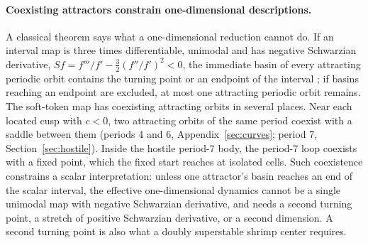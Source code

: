 \documentclass[11pt,letterpaper]{article}
\begin{document}
\paragraph{Coexisting attractors constrain one-dimensional descriptions.} A classical theorem says what a
one-dimensional reduction cannot do. If an interval map is three times differentiable, unimodal and has negative
Schwarzian derivative, $Sf=f'''/f'-\tfrac32(f''/f')^2<0$, the immediate basin of every attracting periodic orbit
contains the turning point or an endpoint of the interval \cite{singer1978stable}; if basins reaching an endpoint are
excluded, at most one attracting periodic orbit remains. The soft-token map has coexisting attracting orbits in several
places. Near each located cusp with
$c<0$, two attracting orbits of the same period coexist with a saddle between them (periods 4 and 6, Appendix~\ref{sec:curves}; period 7, Section~\ref{sec:hostile}). Inside the hostile period-7 body, the period-7 loop
coexists with a fixed point, which the fixed start reaches at isolated cells. Such coexistence constrains a scalar
interpretation: unless one attractor's basin reaches an end of the scalar interval, the effective one-dimensional
dynamics cannot be a single unimodal map with negative Schwarzian derivative, and needs a second turning point, a
stretch of positive Schwarzian derivative, or a second dimension. A second turning point is also what a doubly
superstable shrimp center requires.


\end{document}
